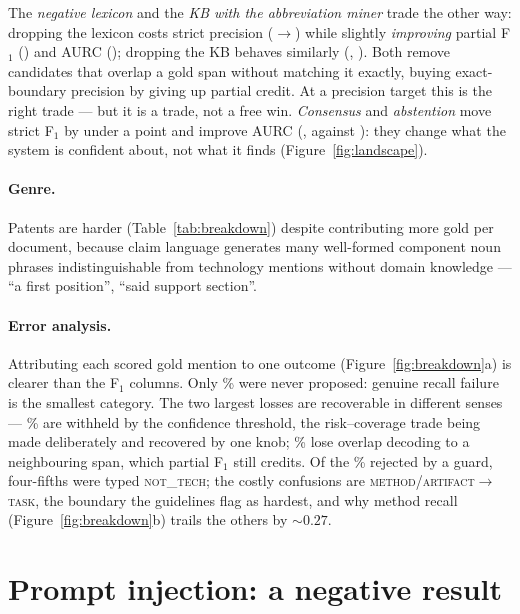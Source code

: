 \documentclass[11pt]{article}
\begin{document}
The \emph{negative lexicon} and the \emph{KB with the abbreviation miner} trade
the other way: dropping the lexicon costs strict precision
(\RFullP{}$\rightarrow$\RNoNegativeP) while slightly \emph{improving} partial
F$_1$ (\RNoNegativePF) and AURC (\RNoNegativeAurc); dropping the KB behaves
similarly (\RNoStructurePF, \RNoStructureAurc). Both remove candidates that
overlap a gold span without matching it exactly, buying exact-boundary precision
by giving up partial credit. At a precision target this is the right trade --- but
it is a trade, not a free win. \emph{Consensus} and \emph{abstention} move strict
F$_1$ by under a point and improve AURC (\RNoConsensusAurc, \RNoAbstentionAurc{}
against \RFullAurc): they change what the system is confident about, not what it
finds (Figure~\ref{fig:landscape}).

\paragraph{Genre.} Patents are harder (Table~\ref{tab:breakdown}) despite
contributing more gold per document, because claim language generates many
well-formed component noun phrases indistinguishable from technology mentions
without domain knowledge --- ``a first position'', ``said support section''.

\paragraph{Error analysis.} Attributing each scored gold mention to one outcome
(Figure~\ref{fig:breakdown}a) is clearer than the F$_1$ columns. Only
\ErrNeverProposed\% were never proposed: genuine recall failure is the smallest
category. The two largest losses are recoverable in different senses ---
\ErrWithheld\% are withheld by the confidence threshold, the risk--coverage trade
being made deliberately and recovered by one knob; \ErrDecode\% lose overlap
decoding to a neighbouring span, which partial F$_1$ still credits. Of the
\ErrRejected\% rejected by a guard, four-fifths were
typed \textsc{not\_tech}; the costly confusions are
\textsc{method}/\textsc{artifact}$\rightarrow$\textsc{task}, the boundary the
guidelines flag as hardest, and why method recall
(Figure~\ref{fig:breakdown}b) trails the others by ${\sim}0.27$.

\section{Prompt injection: a negative result}
\label{sec:injection}
\end{document}
